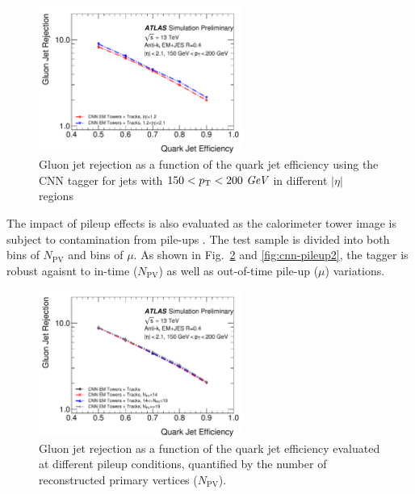 \begin{figure}[htpb]
\begin{center}
 \includegraphics[width=0.6\textwidth]{figures/CNN/ROC_pt150_200_eta.pdf}
\caption{Gluon jet rejection as a function of the quark jet efficiency using the CNN tagger for jets with $150<p_{{\rm T}}<200~\textit{GeV}$ in different $|\eta|$ regions}
\label{fig:cnn-tracktruth}
\end{center}
\end{figure}

The impact of pileup effects is also evaluated as the calorimeter tower image is subject to contamination from pile-ups
. The test sample is divided into both bins of $N_\text{PV}$
and bins of $\mu$. As shown in Fig.~\ref{fig:cnn-pileup} and \ref{fig:cnn-pileup2}, the tagger is robust agaisnt
to in-time ($N_\text{PV}$) as well as out-of-time pile-up ($\mu$) variations.

\begin{figure}[htpb]
\begin{center}
\includegraphics[width=0.6\textwidth]{figures/CNN/ROC_pt150_200_NPV.pdf}
\caption{Gluon jet rejection as a function of the quark jet efficiency %
evaluated at different pileup conditions, 
quantified by the number of reconstructed primary vertices ($N_\text{PV}$).}
\label{fig:cnn-pileup}
\end{center}
\end{figure}

